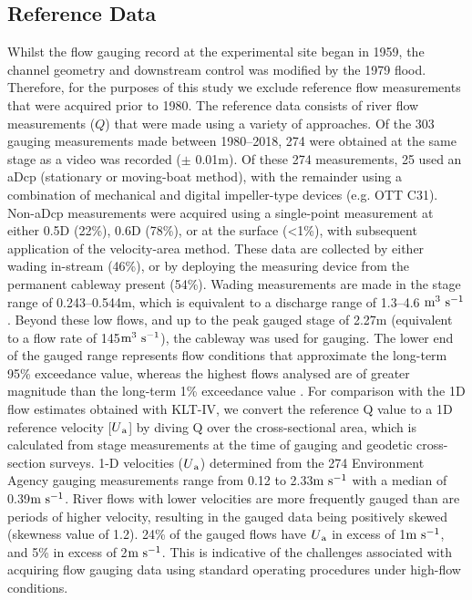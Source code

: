 \documentclass[hess, manuscript]{copernicus} %
\begin{document}
\subsection{Reference Data}
Whilst the flow gauging record at the experimental site began in 1959, the channel geometry and downstream control was modified by the 1979 flood. Therefore, for the purposes of this study we exclude reference flow measurements that were acquired prior to 1980. The reference data consists of river flow measurements ($Q$) that were made using a variety of approaches. Of the 303 gauging measurements made between 1980--2018, 274 were obtained at the same stage as a video was recorded ($\pm$ 0.01m). Of these 274 measurements, 25 used an aDcp (stationary or moving-boat method), with the remainder using a combination of mechanical and digital impeller-type devices (e.g. OTT C31). Non-aDcp measurements were acquired using a single-point measurement at either 0.5D (22\%), 0.6D (78\%), or at the surface (<1\%), with subsequent application of the velocity-area method. These data are collected by either wading in-stream (46\%), or by deploying the measuring device from the permanent cableway present (54\%). Wading measurements are made in the stage range of 0.243--0.544m, which is equivalent to a discharge range of 1.3--4.6 $\textnormal{m\textsuperscript{3} s\textsuperscript{-1}}$. Beyond these low flows, and up to the peak gauged stage of 2.27m (equivalent to a flow rate of 145$\textnormal{m\textsuperscript{3} s\textsuperscript{-1}}$), the cableway was used for gauging. The lower end of the gauged range represents flow conditions that approximate the long-term 95\% exceedance value, whereas the highest flows analysed are of greater magnitude than the long-term 1\% exceedance value \citep{ceh2024}. For comparison with the 1D flow estimates obtained with KLT-IV, we convert the reference Q value to a 1D reference velocity [$U\textsubscript{a}$] by diving Q over the cross-sectional area, which is calculated from stage measurements at the time of gauging and geodetic cross-section surveys. 1-D velocities ($U\textsubscript{a}$) determined from the 274 Environment Agency gauging measurements range from 0.12 to 2.33$\textnormal{m s\textsuperscript{-1}}$ with a median of 0.39$\textnormal{m s\textsuperscript{-1}}$. River flows with lower velocities are more frequently gauged than are periods of higher velocity, resulting in the gauged data being positively skewed (skewness value of 1.2). 24\% of the gauged flows have $U\textsubscript{a}$ in excess of 1$\textnormal{m s\textsuperscript{-1}}$, and 5\% in excess of 2$\textnormal{m s\textsuperscript{-1}}$. This is indicative of the challenges associated with acquiring flow gauging data using standard operating procedures under high-flow conditions. 
\end{document}
